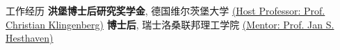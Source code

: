 %
\begin{rubric}{\songti 工作经历}
%
\entry*[2023.10 -- 2025.09] \textbf{洪堡博士后研究奖学金}, 德国维尔茨堡大学
\href{https://ifm.mathematik.uni-wuerzburg.de/~klingen}{(Host Professor: Prof. Christian Klingenberg)}%
\entry*[2021.09 -- 2023.09] \textbf{博士后}, 瑞士洛桑联邦理工学院
\href{https://people.epfl.ch/jan.hesthaven?lang=en}{(Mentor: Prof. Jan S. Hesthaven)}\end{rubric}


